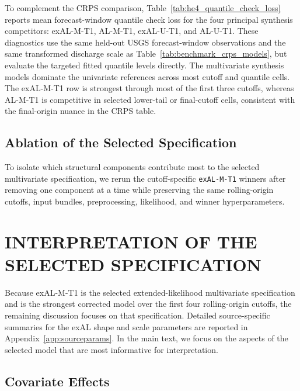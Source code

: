 \documentclass[APA,STIX1COL]{WileyNJD-v2}
\begin{document}
To complement the CRPS comparison, Table~\ref{tab:he4_quantile_check_loss} reports mean forecast-window quantile check loss for the four principal synthesis competitors: exAL-M-T1, AL-M-T1, exAL-U-T1, and AL-U-T1. These diagnostics use the same held-out USGS forecast-window observations and the same transformed discharge scale as Table~\ref{tab:benchmark_crps_models}, but evaluate the targeted fitted quantile levels directly. The multivariate synthesis models dominate the univariate references across most cutoff and quantile cells. The exAL-M-T1 row is strongest through most of the first three cutoffs, whereas AL-M-T1 is competitive in selected lower-tail or final-cutoff cells, consistent with the final-origin nuance in the CRPS table.




\subsection{Ablation of the Selected Specification}
\label{subsec:he3ablation}

To isolate which structural components contribute most to the selected multivariate specification, we rerun the cutoff-specific \texttt{exAL-M-T1} winners after removing one component at a time while preserving the same rolling-origin cutoffs, input bundles, preprocessing, likelihood, and winner hyperparameters.


\section{INTERPRETATION OF THE SELECTED SPECIFICATION}
\label{sec:interpretation}

Because exAL-M-T1 is the selected extended-likelihood multivariate specification and is the strongest corrected model over the first four rolling-origin cutoffs, the remaining discussion focuses on that specification. Detailed source-specific summaries for the exAL shape and scale parameters are reported in Appendix~\ref{app:sourceparams}. In the main text, we focus on the aspects of the selected model that are most informative for interpretation.

\subsection{Covariate Effects}
\end{document}
